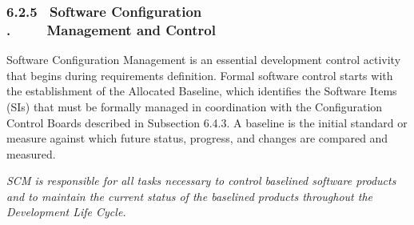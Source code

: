 \documentclass[10pt,twocolumn]{article}
\begin{document}
\subsubsection*{6.2.5 $\,$ Software Configuration\\{\color{white}.} $\qquad$ Management and Control}

Software Configuration Management is an essential development control activity that begins during requirements definition. Formal software control starts with the establishment
of the Allocated Baseline, which identifies the Software Items
(SIs) that must be formally managed in coordination with
the Configuration Control Boards described in Subsection
6.4.3. A baseline is the initial standard or measure against
which future status, progress, and changes are compared and
measured.

\vspace{0.5cm}
\begin{minipage}[right]{.4\textwidth}
\textit{SCM is responsible for all tasks necessary to control
	baselined software products and to maintain the
	current status of the baselined products throughout
	the Development Life Cycle.}
\end{minipage}
\vspace{0.5cm}
\end{document}
